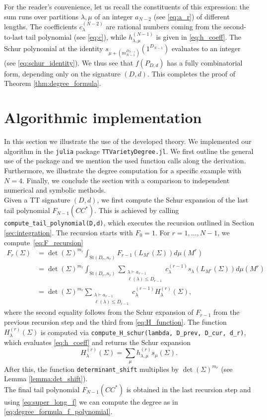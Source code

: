 \documentclass{article}
\theoremstyle{definition}
\newcommand{\St}{\mathrm{St}}
\begin{document}
For the reader's convenience, let us recall the constituents of this expression: the sum runs over partitions $\lambda, \mu$ of an integer $a_{N-2}$ (see \eqref{eq:a_r}) of different lengths. The coefficients $c_\lambda^{(N-2)}$ are rational numbers coming from the second-to-last tail polynomial (see \eqref{eq:c}), while $h_{\lambda,\mu}^{(N-1)}$ is given in \eqref{eq:h_coeff}. The Schur polynomial at the identity $s_{\mu+(m_{N-1}^{D_{N-1}})}(1^{D_{N-1}})$ evaluates to an integer (see \eqref{eq:schur_identity}). We thus see that $f(P_{D,d})$ has a fully combinatorial form, depending only on the signature $(D,d)$. This completes the proof of Theorem \ref{thm:degree_formula}.


\section{Algorithmic implementation}\label{sec:implementation}
In this section we illustrate the use of the developed theory. We implemented our algorithm in the \texttt{julia} package \texttt{TTVarietyDegree.jl}. We first outline the general use of the package and we mention the used function calls along the derivation. Furthermore, we illustrate the degree computation for a specific example with $N=4$. Finally, we conclude the section with a comparison to independent numerical and symbolic methods.\\

Given a TT signature $(D,d)$, we first compute the Schur expansion of the last tail polynomial $F_{N-1}(CC^*)$. This is achieved by calling \texttt{compute\_tail\_polynomial(D,d)}, which executes the recursion outlined in Section \ref{sec:integration}.
The recursion starts with $F_0=1$. For $r=1,\dots,N-1$, we compute~\eqref{eq:F_recursion}
\begin{align*}
    F_r(\Sigma)
&=
\det(\Sigma)^{m_r}\int_{\St(D_r, n_r)}F_{r-1}(L_{M^r}(\Sigma))d\mu(M^r) \\
&= \det(\Sigma)^{m_r}\int_{\St(D_r, n_r)}\sum_{\substack{\lambda\vdash a_{r-1}\\ \ell(\lambda)\le D_{r-1}}}
c_\lambda^{(r-1)}s_\lambda(L_{M^r}(\Sigma))d\mu(M^r) \\
&=\det(\Sigma)^{m_r}\sum_{\substack{\lambda\vdash a_{r-1}\\ \ell(\lambda)\le D_{r-1}}}
c_\lambda^{(r-1)}H^{(r)}_\lambda(\Sigma),
\end{align*}
where the second equality follows from the Schur expansion of $F_{r-1}$ from the previous recursion step and the third from \eqref{eq:H_function}.
The function $H^{(r)}_\lambda(\Sigma)$ is computed via \texttt{compute\_H\_schur(lambda, D\_prev, D\_cur, d\_r)}, which evaluates \eqref{eq:h_coeff} and returns the Schur expansion 
\[
H_\lambda^{(r)}(\Sigma)
=
\sum_\mu h_{\lambda,\mu}^{(r)}s_\mu(\Sigma).
\]
After this, the function \texttt{determinant\_shift} multiplies by $\det(\Sigma)^{m_r}$ (see Lemma \ref{lemma:det_shift}).
\\
The final tail polynomial $F_{N-1}(CC^*)$ is obtained in the last recursion step and using \eqref{eq:super_long_f} we can compute the degree as in \eqref{eq:degree_formula_f_polynomial}.
\end{document}
